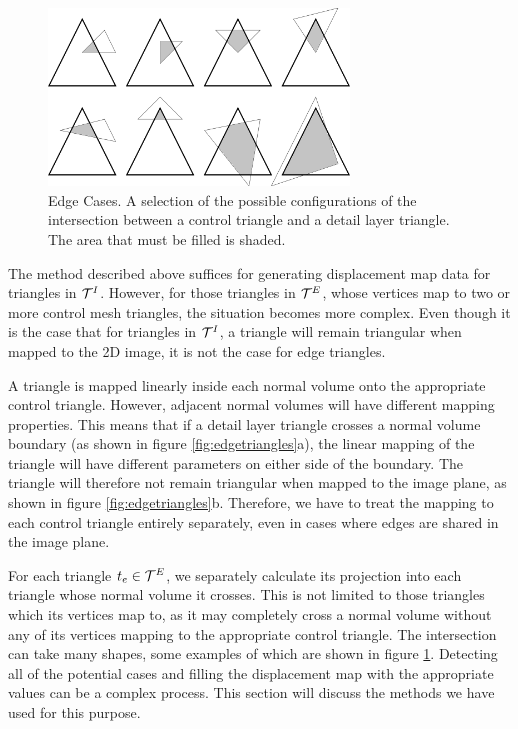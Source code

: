 \begin{figure}
\begin{center}
\includegraphics[width=8cm]{../images/edgetris}
\caption[Edge Cases]{\label{fig:edgecases} Edge Cases. A selection of the possible configurations of the intersection between a control triangle and a detail layer triangle. The area that must be filled is shaded.}
\end{center}
\end{figure}
The method described above suffices for generating displacement map data for triangles in ${\cal T}^I$. However, for those triangles in ${\cal T}^E$, whose vertices map to two or more control mesh triangles, the situation becomes more complex. Even though it is the case that for triangles in ${\cal T}^I$, a triangle will remain triangular when mapped to the 2D image, it is not the case for edge triangles. 

A triangle is mapped linearly inside each normal volume onto the appropriate control triangle. However, adjacent normal volumes will have different mapping properties. This means that if a detail layer triangle crosses a normal volume boundary (as shown in figure \ref{fig:edgetriangles}a), the linear mapping of the triangle will have different parameters on either side of the boundary. The triangle will therefore not remain triangular when mapped to the image plane, as shown in figure \ref{fig:edgetriangles}b.  Therefore, we have to treat the mapping to each control triangle entirely separately, even in cases where edges are shared in the image plane.

For each triangle $t_e \in {\cal T}^E$, we separately calculate its projection into each triangle whose normal volume it crosses. This is not limited to those triangles which its vertices map to, as it may completely cross a normal volume without any of its vertices mapping to the appropriate control triangle. The intersection can take many shapes, some examples of which are shown in figure \ref{fig:edgecases}. Detecting all of the potential cases and filling the displacement map with the appropriate values can be a complex process. This section will discuss the methods we have used for this purpose.

